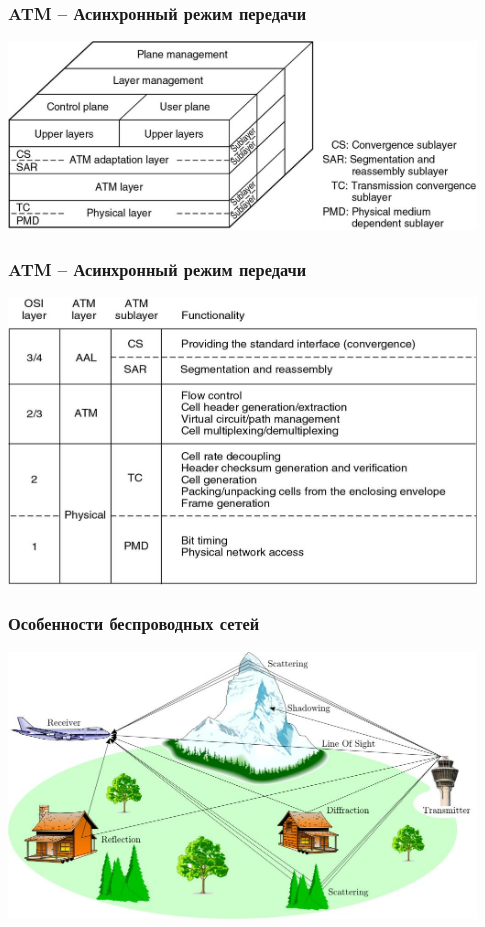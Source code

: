 \documentclass[utf8]{beamer}
\begin{document}
\begin{frame}
\frametitle{ATM -- Асинхронный режим передачи}
\includegraphics[width=0.93\textwidth]{pic/atm-reference.jpg}
\end{frame}
\begin{frame}
\frametitle{ATM -- Асинхронный режим передачи}
\includegraphics[width=0.93\textwidth]{pic/atm-layers.jpg}
\end{frame}
\begin{frame}
\frametitle{Особенности беспроводных сетей}
\includegraphics[width=0.93\textwidth]{pic/multipath_propagation.png}
\end{frame}
\end{document}
